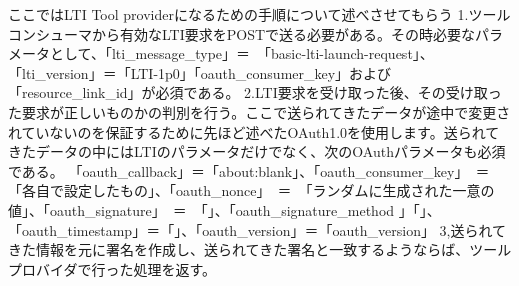 ここではLTI Tool providerになるための手順について述べさせてもらう
1.ツールコンシューマから有効なLTI要求をPOSTで送る必要がある。その時必要なパラメータとして、「lti_message_type」＝　「basic-lti-launch-request」、「lti_version」＝「LTI-1p0」「oauth_consumer_key」および「resource_link_id」が必須である。
2.LTI要求を受け取った後、その受け取った要求が正しいものかの判別を行う。ここで送られてきたデータが途中で変更されていないのを保証するために先ほど述べたOAuth1.0を使用します。送られてきたデータの中にはLTIのパラメータだけでなく、次のOAuthパラメータも必須である。
「oauth_callback」＝「about:blank」、「oauth_consumer_key」　＝　「各自で設定したもの」、「oauth_nonce」　＝　「ランダムに生成された一意の値」、「oauth_signature」　＝　「」、「oauth_signature_method 」「」、「oauth_timestamp」＝「」、「oauth_version」＝「oauth_version」
3,送られてきた情報を元に署名を作成し、送られてきた署名と一致するようならば、ツールプロバイダで行った処理を返す。

